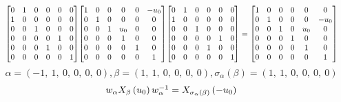 \documentclass[11pt]{article}
\theoremstyle{definition}
\begin{document}
\[
\scaletoalign{\textwidth}{{\left[\begin{matrix}0 & 1 & 0 & 0 & 0 & 0\\1 & 0 & 0 & 0 & 0 & 0\\0 & 0 & 1 & 0 & 0 & 0\\0 & 0 & 0 & 0 & 1 & 0\\0 & 0 & 0 & 1 & 0 & 0\\0 & 0 & 0 & 0 & 0 & 1\end{matrix}\right]} {\left[\begin{matrix}1 & 0 & 0 & 0 & 0 & - u_{0}\\0 & 1 & 0 & 0 & 0 & 0\\0 & 0 & 1 & u_{0} & 0 & 0\\0 & 0 & 0 & 1 & 0 & 0\\0 & 0 & 0 & 0 & 1 & 0\\0 & 0 & 0 & 0 & 0 & 1\end{matrix}\right]} {\left[\begin{matrix}0 & 1 & 0 & 0 & 0 & 0\\1 & 0 & 0 & 0 & 0 & 0\\0 & 0 & 1 & 0 & 0 & 0\\0 & 0 & 0 & 0 & 1 & 0\\0 & 0 & 0 & 1 & 0 & 0\\0 & 0 & 0 & 0 & 0 & 1\end{matrix}\right]} = {\left[\begin{matrix}1 & 0 & 0 & 0 & 0 & 0\\0 & 1 & 0 & 0 & 0 & - u_{0}\\0 & 0 & 1 & 0 & u_{0} & 0\\0 & 0 & 0 & 1 & 0 & 0\\0 & 0 & 0 & 0 & 1 & 0\\0 & 0 & 0 & 0 & 0 & 1\end{matrix}\right]}}
\]
\[
\alpha = \left( -1, \  1, \  0, \  0, \  0, \  0\right), \beta = \left( 1, \  1, \  0, \  0, \  0, \  0\right), \sigma_{\alpha}(\beta) = \left( 1, \  1, \  0, \  0, \  0, \  0\right)
\]
\[
\scaletoalign{\textwidth}{w_{\alpha} X_{\beta}\left(u_{0}\right) w_{\alpha}^{-1} = X_{\sigma_{\alpha}\left(\beta\right)}\left(- u_{0}\right)}
\]
\end{document}
